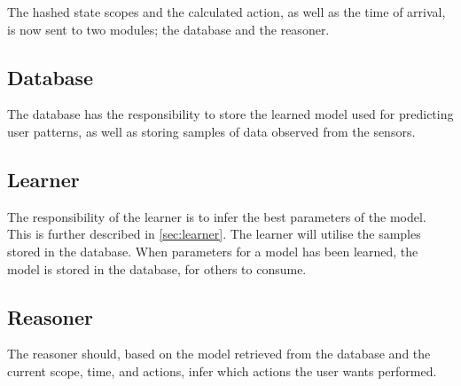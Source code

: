 The hashed state scopes and the calculated action, as well as the time of arrival, is now sent to two modules; the database and the reasoner.

\subsection{Database}
The database has the responsibility to store the learned model used for predicting user patterns, as well as storing samples of data observed from the sensors.

\subsection{Learner}
The responsibility of the learner is to infer the best parameters of the model. This is further described in \cref{sec:learner}. The learner will utilise the samples stored in the database. When parameters for a model has been learned, the model is stored in the database, for others to consume.

\subsection{Reasoner}
The reasoner should, based on the model retrieved from the database and the current scope, time, and actions, infer which actions the user wants performed.
